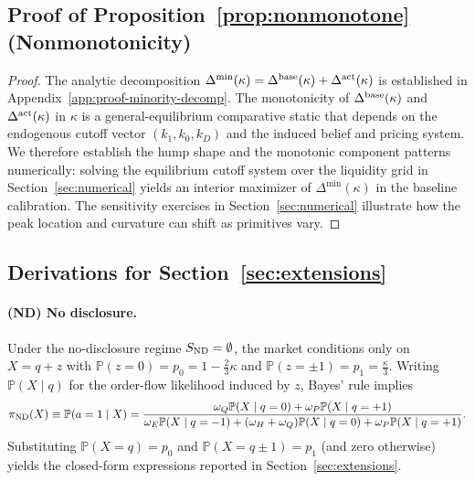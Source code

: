 \documentclass[11pt]{article}
\newcommand{\PP}{\mathbb{P}}
\newcommand{\1}{\mathbf{1}}
\begin{document}
\subsection{Proof of Proposition~\ref{prop:nonmonotone} (Nonmonotonicity)}
\label{app:proof-nonmonotone}

\begin{proof}
The analytic decomposition $\Delta^{\min}(\kappa)=\Delta^{\textup{base}}(\kappa)+\Delta^{\textup{act}}(\kappa)$ is established in Appendix~\ref{app:proof-minority-decomp}. The monotonicity of $\Delta^{\textup{base}}(\kappa)$ and $\Delta^{\textup{act}}(\kappa)$ in $\kappa$ is a general-equilibrium comparative static that depends on the endogenous cutoff vector $(k_1,k_0,k_D)$ and the induced belief and pricing system. We therefore establish the hump shape and the monotonic component patterns numerically: solving the equilibrium cutoff system over the liquidity grid in Section~\ref{sec:numerical} yields an interior maximizer of $\Delta^{\min}(\kappa)$ in the baseline calibration. The sensitivity exercises in Section~\ref{sec:numerical} illustrate how the peak location and curvature can shift as primitives vary.
\end{proof}

\subsection{Derivations for Section~\ref{sec:extensions}}
\label{app:extensions-derivations}

\paragraph{(ND) No disclosure.}
Under the no-disclosure regime $S_{\textup{ND}}=\emptyset$, the market conditions only on $X=q+z$ with
$\PP(z=0)=p_0=1-\frac{2}{3}\kappa$ and $\PP(z=\pm1)=p_1=\frac{\kappa}{3}$. Writing $\PP(X \mid q)$ for the order-flow likelihood induced by $z$, Bayes' rule implies
\[
\pi_{\textup{ND}}(X)\equiv \PP(a=1 \mid X)
=\frac{\omega_Q\PP(X \mid q=0)+\omega_P\PP(X \mid q=+1)}
{\omega_E\PP(X \mid q=-1)+(\omega_H+\omega_Q)\PP(X \mid q=0)+\omega_P\PP(X \mid q=+1)}.
\]
Substituting $\PP(X=q)=p_0$ and $\PP(X=q\pm1)=p_1$ (and zero otherwise) yields the closed-form expressions reported in Section~\ref{sec:extensions}.
\end{document}
